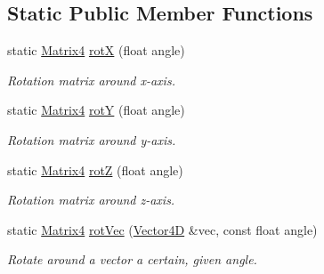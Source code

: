 \subsection*{Static Public Member Functions}
\begin{DoxyCompactItemize}
\item 
\mbox{\label{class_matrix4_ad0f776311d4fa444adcb5563650bc210}} 
static \mbox{\hyperlink{class_matrix4}{Matrix4}} \mbox{\hyperlink{class_matrix4_ad0f776311d4fa444adcb5563650bc210}{rotX}} (float angle)
\begin{DoxyCompactList}\small\item\em Rotation matrix around x-\/axis. \end{DoxyCompactList}\item 
\mbox{\label{class_matrix4_a0063a003daa39cce2c9fb2693b600093}} 
static \mbox{\hyperlink{class_matrix4}{Matrix4}} \mbox{\hyperlink{class_matrix4_a0063a003daa39cce2c9fb2693b600093}{rotY}} (float angle)
\begin{DoxyCompactList}\small\item\em Rotation matrix around y-\/axis. \end{DoxyCompactList}\item 
\mbox{\label{class_matrix4_aaf387ef01b3ca7897f01a35fffa6c35f}} 
static \mbox{\hyperlink{class_matrix4}{Matrix4}} \mbox{\hyperlink{class_matrix4_aaf387ef01b3ca7897f01a35fffa6c35f}{rotZ}} (float angle)
\begin{DoxyCompactList}\small\item\em Rotation matrix around z-\/axis. \end{DoxyCompactList}\item 
\mbox{\label{class_matrix4_a970a4f16ef00a0893c3f25531522efd3}} 
static \mbox{\hyperlink{class_matrix4}{Matrix4}} \mbox{\hyperlink{class_matrix4_a970a4f16ef00a0893c3f25531522efd3}{rot\+Vec}} (\mbox{\hyperlink{class_vector4_d}{Vector4D}} \&vec, const float angle)
\begin{DoxyCompactList}\small\item\em Rotate around a vector a certain, given angle. \end{DoxyCompactList}\item 
\mbox{\label{class_matrix4_ab970165b164d6bebbafae4004b80f7b3}} 

\end{DoxyCompactItemize}
